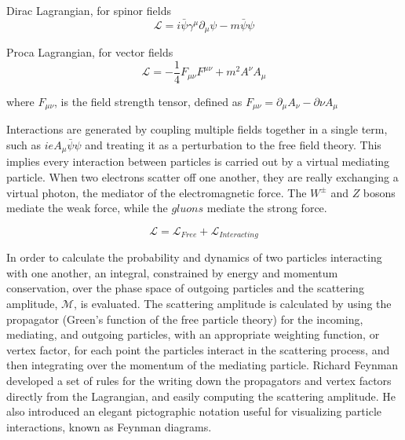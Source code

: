 \noindent Dirac Lagrangian, for spinor fields
\begin{equation}\label{eq:dirac_lagrangian}
\mathcal{L} = i\bar{\psi}\gamma^{\mu}\partial_{\mu}\psi - m\bar{\psi}\psi 
\end{equation}

\noindent Proca Lagrangian, for vector fields
\begin{equation}\label{eq:proca_lagrangian}
\mathcal{L} = -\frac{1}{4}F_{\mu\nu}F^{\mu\nu} + m^{2}A^{\nu}A_{\mu} 
\end{equation}

\noindent where $F_{\mu\nu}$, is the field strength tensor, defined as
$F_{\mu\nu} = \partial_{\mu}A_{\nu} - \partial{\nu}A_{\mu}$

\par Interactions are generated by coupling multiple fields together in a
single term, such as $ieA_{\mu}\bar{\psi}\psi$ and treating it as a
perturbation to the free field theory.  This implies every interaction
between particles is carried out by a virtual mediating particle.  When two
electrons scatter off one another, they are really exchanging a
virtual photon, the mediator of the electromagnetic force.  The
$W^{\pm}$ and $Z$ bosons mediate the weak force, while the $gluons$
mediate the strong force.  

\begin{equation}\label{eq:lagrangian_free_interacting}
\mathcal{L} = \mathcal{L}_{Free} + \mathcal{L}_{Interacting}
\end{equation}

\par In order to calculate the probability and dynamics of two
particles interacting with one another, an integral, constrained by
energy and momentum conservation, over the phase space of outgoing
particles and the scattering amplitude, $\mathcal{M}$, is evaluated.
The scattering amplitude is calculated by using the propagator (Green's
function of the free particle theory) for the incoming, mediating, and
outgoing particles, with an appropriate weighting function, or vertex
factor, for each point the particles interact in the scattering
process, and then integrating over the momentum of the mediating
particle.  Richard Feynman developed a set of rules for the writing
down the propagators and vertex factors directly from the Lagrangian,
and easily computing the scattering amplitude.  He also introduced an
elegant pictographic notation useful for visualizing particle
interactions, known as Feynman diagrams. 

